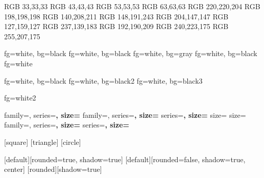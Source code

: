
\definecolor{black}   {RGB} {33,33,33}
\definecolor{black2}  {RGB} {43,43,43}
\definecolor{black3}  {RGB} {53,53,53}
\definecolor{gray}    {RGB} {63,63,63}
\definecolor{white}   {RGB} {220,220,204}
\definecolor{white2}  {RGB} {198,198,198}
\definecolor{cyan}    {RGB} {140,208,211}
\definecolor{blue}    {RGB} {148,191,243}
\definecolor{red}     {RGB} {204,147,147} 
\definecolor{green}   {RGB} {127,159,127}
\definecolor{magenta} {RGB} {237,139,183}
\definecolor{purple}  {RGB} {192,190,209}
\definecolor{yellow}  {RGB} {240,223,175}
\definecolor{brown}   {RGB} {255,207,175}


          {fg=white, bg=black}
     {fg=white, bg=black}
    {fg=white, bg=gray} 
           {fg=white, bg=black} 
 {fg=white}

   {fg=white, bg=black}
 {fg=white, bg=black2}
      {fg=white, bg=black3}

           {fg=white2}

          {family=\sffamily, series=\bfseries, size=\Large}
       {family=\sffamily, series=\bfseries, size=\large}
         {series=\bfseries, size=\normalsize}
      {size=\small}
           {size=\scriptsize} 
     {family=\sffamily, series=\bfseries, size=\Large}
 {series=\bfseries, size=\large}


[square]
[triangle]
[circle]

\setlength{\leftmargini}{0pt}

[default][rounded=true, shadow=true]
[default][rounded=false, shadow=true, center]
[rounded][shadow=true] 


